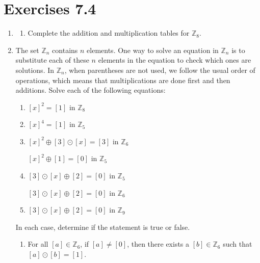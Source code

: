 \section*{Exercises 7.4}
%
\begin{enumerate} 
\item \label{exer:sec74-modtables} \begin{enumerate}
  \yitem Complete the addition and multiplication tables for  $\mathbb{Z}_4$.
  
  \yitem Complete the addition and multiplication tables for  $\mathbb{Z}_7$.

  \item Complete the addition and multiplication tables for  $\mathbb{Z}_8$.
\end{enumerate}

\item The set  $\mathbb{Z}_n $ contains  $n$  elements.  One way to solve an equation in  
$\mathbb{Z}_n $ is to substitute each of these  $n$  elements in the equation to check which ones are solutions.  In $\mathbb{Z}_n $, when parentheses are not used, we follow the usual order of operations, which means that multiplications are done first and then additions.  Solve each of the following equations: 
\label{exer:sec74-3}%

\begin{multicols}{2}
\begin{enumerate}
\yitem $[ x ]^2  = [ 1 ]$  in  $\mathbb{Z}_4 $

\item $[ x ]^2  = [ 1 ]$  in  $\mathbb{Z}_8 $

\item $[ x ]^4  = [ 1 ]$  in  $\mathbb{Z}_5 $	

\item $[ x ]^2  \oplus [ 3 ] \odot [ x ] = 
[ 3 ]$  in  $\mathbb{Z}_6 $

\yitem $[ x ]^2  \oplus [ 1 ] = [ 0 ]$  in  
$\mathbb{Z}_5 $

\item $[ 3 ] \odot [ x ] \oplus [ 2 ] = [ 0 ]$
  in  $\mathbb{Z}_5 $

\yitem $[ 3 ] \odot [ x ] \oplus [ 2 ] = [ 0 ]$
  in  $\mathbb{Z}_6 $

\item $[ 3 ] \odot [ x ] \oplus [ 2 ] = [ 0 ]$
  in  $\mathbb{Z}_9 $
\end{enumerate}
\end{multicols}

\xitem In each case, determine if the statement is true or false. 
\label{exer:sec74-4}%
\begin{enumerate}
\item For all  $[ a ] \in \mathbb{Z}_6 $, if  
      $[ a ] \ne [ 0 ]$, then there exists a  
      $[ b ] \in \mathbb{Z}_6 $ such that 
      $[ a ] \odot [ b ] = [ 1 ]$.


\end{enumerate}
\end{enumerate}
